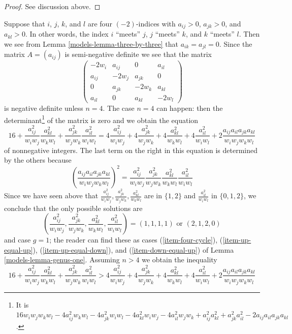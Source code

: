 
\begin{proof}
See discussion above.
\end{proof}

Suppose that $i$, $j$, $k$, and $l$ are four $(-2)$-indices with
$a_{ij} > 0$, $a_{jk} > 0$, and $a_{kl} > 0$. In other words, the
index $i$ ``meets'' $j$, $j$ ``meets'' $k$, and $k$ ``meets'' $l$.
Then we see from Lemma \ref{models-lemma-three-by-three} that $a_{ik} = a_{jl} = 0$.
Since the matrix $A = (a_{ij})$ is semi-negative definite we see that the
matrix
$$
\left(
\begin{matrix}
-2w_i & a_{ij} & 0 & a_{il} \\
a_{ij} & -2w_j & a_{jk} & 0 \\
0 & a_{jk} & -2w_k & a_{kl} \\
a_{il} & 0 & a_{kl} & -2w_l
\end{matrix}
\right)
$$
is negative definite unless $n = 4$. The case $n = 4$ can happen:
then the determinant\footnote{It is
$16w_iw_jw_kw_l - 4a_{ij}^2w_kw_l - 4a_{jk}^2w_iw_l - 4a_{kl}^2w_iw_j -
4a_{il}^2w_jw_k + a_{ij}^2a_{kl}^2 + a_{jk}^2a_{il}^2 -
2a_{ij}a_{il}a_{jk}a_{kl}$.} of the matrix is zero and we obtain the equation
$$
16 +
\frac{a_{ij}^2}{w_iw_j}\frac{a_{kl}^2}{w_kw_l} +
\frac{a_{jk}^2}{w_jw_k}\frac{a_{il}^2}{w_iw_l} =
4\frac{a_{ij}^2}{w_iw_j} + 4\frac{a_{jk}^2}{w_jw_k} + 4\frac{a_{kl}^2}{w_kw_l}
+ 4\frac{a_{il}^2}{w_iw_l} + 2\frac{a_{ij}a_{il}a_{jk}a_{kl}}{w_iw_jw_kw_l}
$$
of nonnegative integers. The last term on the right in this equation is
determined by the others because
$$
\left(\frac{a_{ij}a_{il}a_{jk}a_{kl}}{w_iw_jw_kw_l}\right)^2 =
\frac{a_{ij}^2}{w_iw_j} \frac{a_{jk}^2}{w_jw_k}
\frac{a_{kl}^2}{w_kw_l} \frac{a_{il}^2}{w_iw_l}
$$
Since we have seen above that
$\frac{a_{ij}^2}{w_iw_j}, \frac{a_{jk}^2}{w_jw_k}, \frac{a_{kl}^2}{w_kw_l}$
are in $\{1, 2\}$ and $\frac{a_{il}^2}{w_iw_l}$ in $\{0, 1, 2\}$,
we conclude that the only possible solutions are
$$
(\frac{a_{ij}^2}{w_iw_j}, \frac{a_{jk}^2}{w_jw_k}, \frac{a_{kl}^2}{w_kw_l},
\frac{a_{il}^2}{w_iw_l}) =
(1, 1, 1, 1) \text{ or } (2, 1, 2, 0)
$$
and case $g = 1$; the reader can find these as cases
(\ref{item-four-cycle}), (\ref{item-up-equal-up}),
(\ref{item-up-equal-down}), and (\ref{item-down-equal-up})
of Lemma \ref{models-lemma-genus-one}. Assuming $n > 4$
we obtain the inequality
$$
16 +
\frac{a_{ij}^2}{w_iw_j}\frac{a_{kl}^2}{w_kw_l} +
\frac{a_{jk}^2}{w_jw_k}\frac{a_{il}^2}{w_iw_l} >
4\frac{a_{ij}^2}{w_iw_j} + 4\frac{a_{jk}^2}{w_jw_k} + 4\frac{a_{kl}^2}{w_kw_l}
+ 4\frac{a_{il}^2}{w_iw_l} + 2\frac{a_{ij}a_{il}a_{jk}a_{kl}}{w_iw_jw_kw_l}
$$
